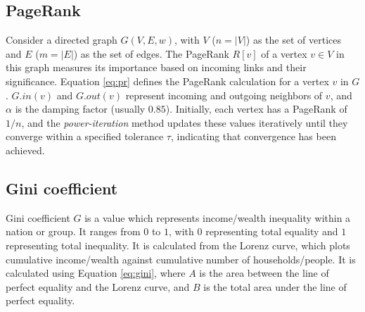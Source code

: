 \subsection{PageRank}
\label{sec:PageRank}

Consider a directed graph $G(V, E, w)$, with $V$ ($n = |V|$) as the set of vertices and $E$ ($m = |E|$) as the set of edges. The PageRank $R[v]$ of a vertex $v \in V$ in this graph measures its importance based on incoming links and their significance. Equation \ref{eq:pr} defines the PageRank calculation for a vertex $v$ in $G$. $G.in(v)$ and $G.out(v)$ represent incoming and outgoing neighbors of $v$, and $\alpha$ is the damping factor (usually $0.85$). Initially, each vertex has a PageRank of $1/n$, and the \textit{power-iteration} method updates these values iteratively until they converge within a specified tolerance $\tau$, indicating that convergence has been achieved.





\subsection{Gini coefficient}

Gini coefficient $G$ is a value which represents income/wealth inequality within a nation or group. It ranges from $0$ to $1$, with $0$ representing total equality and $1$ representing total inequality. It is calculated from the Lorenz curve, which plots cumulative income/wealth against cumulative number of households/people. It is calculated using Equation \ref{eq:gini}, where $A$ is the area between the line of perfect equality and the Lorenz curve, and $B$ is the total area under the line of perfect equality.



